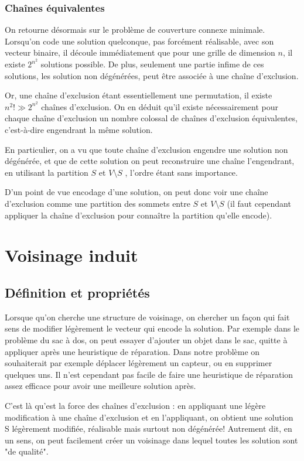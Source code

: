 \documentclass[12pt,a4paper]{article}
\begin{document}
\subsubsection{Chaînes équivalentes}
On retourne désormais sur le problème de couverture connexe minimale.
\\Lorsqu'on code une solution quelconque, pas forcément réalisable, avec son vecteur binaire, il découle immédiatement que pour une grille de dimension $n$, il existe $2^{n^2}$ solutions possible. De plus, seulement une partie infime de ces solutions, les solution non dégénérées, peut être associée à une chaîne d'exclusion.

Or, une chaîne d'exclusion étant essentiellement une permutation, il existe $n^2!\gg 2^{n^2}$ chaînes d'exclusion. On en déduit qu'il existe nécessairement pour chaque chaîne d'exclusion un nombre colossal de chaînes d'exclusion équivalentes, c'est-à-dire engendrant la même solution.

En particulier, on a vu que toute chaîne d'exclusion engendre une solution non dégénérée, et que de cette solution on peut reconstruire une chaîne l'engendrant, en utilisant la partition $S$ et $V\setminus S$ , l'ordre étant sans importance.


D'un point de vue encodage d'une solution, on peut donc voir une chaîne d'exclusion comme une partition des sommets entre $S$ et $V\setminus S$ (il faut cependant appliquer la chaîne d'exclusion pour connaître la partition qu'elle encode).

\section{Voisinage induit}
\subsection{Définition et propriétés}
Lorsque qu'on cherche une structure de voisinage, on chercher un façon qui fait sens de modifier légèrement le vecteur qui encode la solution. Par exemple dans le problème du sac à dos, on peut essayer d'ajouter un objet dans le sac, quitte à appliquer après une heuristique de réparation. Dans notre problème on souhaiterait par exemple déplacer légèrement un capteur, ou en supprimer quelques uns. Il n'est cependant pas facile de faire une heuristique de réparation assez efficace pour avoir une meilleure solution après.

C'est là qu'est la force des chaînes d'exclusion : en appliquant une légère modification à une chaîne d'exclusion et en l'appliquant, on obtient une solution S légèrement modifiée, réalisable mais surtout non dégénérée! Autrement dit, en un sens, on peut facilement créer un voisinage dans lequel toutes les solution sont "de qualité".
\end{document}
